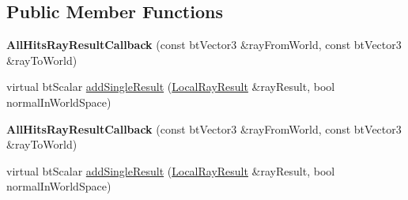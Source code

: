 \subsection*{Public Member Functions}
\begin{DoxyCompactItemize}
\item 
\mbox{\label{structbtCollisionWorld_1_1AllHitsRayResultCallback_a156b1c9d98439529dea5781f38444c1d}} 
{\bfseries All\+Hits\+Ray\+Result\+Callback} (const bt\+Vector3 \&ray\+From\+World, const bt\+Vector3 \&ray\+To\+World)
\item 
virtual bt\+Scalar \hyperlink{structbtCollisionWorld_1_1AllHitsRayResultCallback_a351da818747c246011624b9cb613c29b}{add\+Single\+Result} (\hyperlink{structbtCollisionWorld_1_1LocalRayResult}{Local\+Ray\+Result} \&ray\+Result, bool normal\+In\+World\+Space)
\item 
\mbox{\label{structbtCollisionWorld_1_1AllHitsRayResultCallback_a156b1c9d98439529dea5781f38444c1d}} 
{\bfseries All\+Hits\+Ray\+Result\+Callback} (const bt\+Vector3 \&ray\+From\+World, const bt\+Vector3 \&ray\+To\+World)
\item 
virtual bt\+Scalar \hyperlink{structbtCollisionWorld_1_1AllHitsRayResultCallback_a351da818747c246011624b9cb613c29b}{add\+Single\+Result} (\hyperlink{structbtCollisionWorld_1_1LocalRayResult}{Local\+Ray\+Result} \&ray\+Result, bool normal\+In\+World\+Space)
\end{DoxyCompactItemize}
